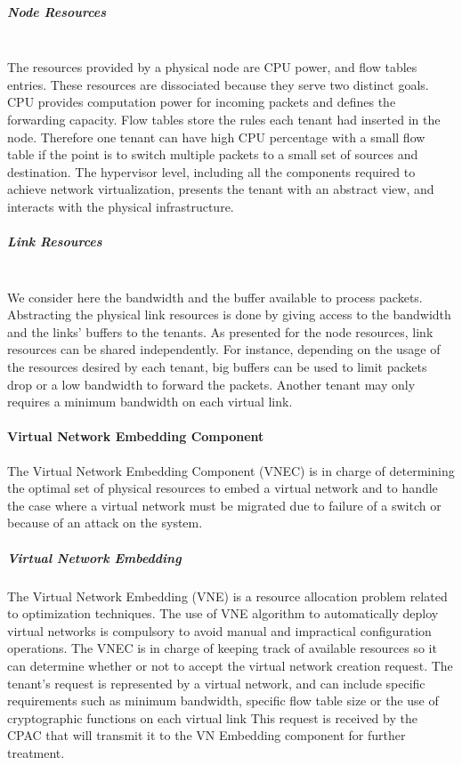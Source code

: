 \subparagraph{\textbf{Node Resources}}\textbf{}\\
The resources provided by a physical node are CPU power, and flow tables entries.
These resources are dissociated because they serve two distinct goals.
CPU provides computation power for incoming packets and defines the forwarding capacity.
Flow tables store the rules each tenant had inserted in the node.
Therefore one tenant can have high CPU percentage with a small flow table if the point is to switch multiple packets to a small set of sources and destination.
The hypervisor level, including all the components required to achieve network virtualization, presents the tenant with an abstract view, and interacts with the physical infrastructure.

\subparagraph{\textbf{Link Resources}}\textbf{}\\
We consider here the bandwidth and the buffer available to process packets.
Abstracting the physical link resources is done by giving access to the bandwidth and the links' buffers to the tenants.
As presented for the node resources, link resources can be shared independently.
For instance, depending on the usage of the resources desired by each tenant, big buffers can be used to limit packets drop or a low bandwidth to forward the packets.
Another tenant may only requires a minimum bandwidth on each virtual link.

\paragraph{Virtual Network Embedding Component}

The Virtual Network Embedding Component (VNEC) is in charge of determining the optimal set of physical resources to embed a virtual network and to handle the case where a virtual network must be migrated due to failure of a switch or because of an attack on the system.

\subparagraph{Virtual Network Embedding}
The Virtual Network Embedding (VNE) is a resource allocation problem related to optimization techniques.
The use of VNE algorithm to automatically deploy virtual networks is compulsory to avoid manual and impractical configuration operations.
The VNEC is in charge of keeping track of available resources so it can determine whether or not to accept the virtual network creation request.
The tenant's request is represented by a virtual network, and can include specific requirements such as minimum bandwidth, specific flow table  size or the use of cryptographic functions on each virtual link \etc 
This request is received by the CPAC that will transmit it to the VN Embedding component for further treatment.

